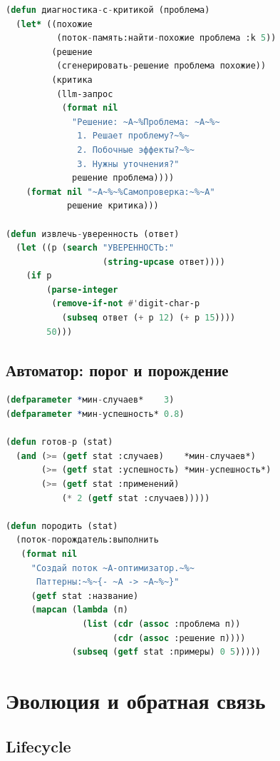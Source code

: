 \documentclass[10pt, oneside]{article}
\begin{document}
\begin{lstlisting}[language=CommonLisp,caption={Двухэтапная диагностика}]
(defun диагностика-с-критикой (проблема)
  (let* ((похожие
          (поток-память:найти-похожие проблема :k 5))
         (решение
          (сгенерировать-решение проблема похожие))
         (критика
          (llm-запрос
           (format nil
             "Решение: ~A~%Проблема: ~A~%~
              1. Решает проблему?~%~
              2. Побочные эффекты?~%~
              3. Нужны уточнения?"
             решение проблема))))
    (format nil "~A~%~%Самопроверка:~%~A"
            решение критика)))

(defun извлечь-уверенность (ответ)
  (let ((p (search "УВЕРЕННОСТЬ:"
                   (string-upcase ответ))))
    (if p
        (parse-integer
         (remove-if-not #'digit-char-p
           (subseq ответ (+ p 12) (+ p 15))))
        50)))
\end{lstlisting}

\subsection{Автоматор: порог и порождение}

\begin{lstlisting}[language=CommonLisp,caption={поток-автоматор.lisp}]
(defparameter *мин-случаев*    3)
(defparameter *мин-успешность* 0.8)

(defun готов-p (stat)
  (and (>= (getf stat :случаев)    *мин-случаев*)
       (>= (getf stat :успешность) *мин-успешность*)
       (>= (getf stat :применений)
           (* 2 (getf stat :случаев)))))

(defun породить (stat)
  (поток-порождатель:выполнить
   (format nil
     "Создай поток ~A-оптимизатор.~%~
      Паттерны:~%~{- ~A -> ~A~%~}"
     (getf stat :название)
     (mapcan (lambda (п)
               (list (cdr (assoc :проблема п))
                     (cdr (assoc :решение п))))
             (subseq (getf stat :примеры) 0 5)))))
\end{lstlisting}

\section{Эволюция и обратная связь}

\subsection{Lifecycle}
\end{document}
